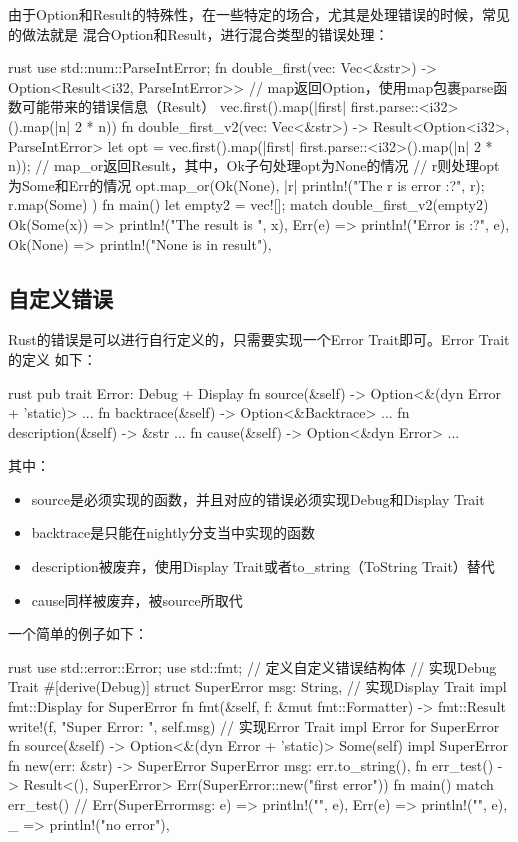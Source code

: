 由于Option和Result的特殊性，在一些特定的场合，尤其是处理错误的时候，常见的做法就是
混合Option和Result，进行混合类型的错误处理：
\begin{code-block}{rust}
use std::num::ParseIntError;
fn double_first(vec: Vec<&str>) -> Option<Result<i32, ParseIntError>> {
    // map返回Option，使用map包裹parse函数可能带来的错误信息（Result）
    vec.first().map(|first| first.parse::<i32>().map(|n| 2 * n))
}
fn double_first_v2(vec: Vec<&str>) -> Result<Option<i32>, ParseIntError> {
    let opt = vec.first().map(|first| first.parse::<i32>().map(|n| 2 * n));
    // map_or返回Result，其中，Ok子句处理opt为None的情况
    // r则处理opt为Some和Err的情况
    opt.map_or(Ok(None), |r| {
        println!("The r is error {:?}", r);
        r.map(Some)
    })
}
fn main() {
    let empty2 = vec![];
    match double_first_v2(empty2) {
        Ok(Some(x)) => println!("The result is {}", x),
        Err(e) => println!("Error is {:?}", e),
        Ok(None) => println!("None is in result"),
    }
}
\end{code-block}

\subsection{自定义错误}
Rust的错误是可以进行自行定义的，只需要实现一个Error Trait即可。Error Trait的定义
如下：
\begin{code-block}{rust}
pub trait Error: Debug + Display {
    fn source(&self) -> Option<&(dyn Error + 'static)> { ... }
    fn backtrace(&self) -> Option<&Backtrace> { ... }
    fn description(&self) -> &str { ... }
    fn cause(&self) -> Option<&dyn Error> { ... }
}
\end{code-block}
其中：
\begin{itemize}
  \item source是必须实现的函数，并且对应的错误必须实现Debug和Display Trait
  \item backtrace是只能在nightly分支当中实现的函数
  \item description被废弃，使用Display Trait或者to\_string（ToString Trait）替代
  \item cause同样被废弃，被source所取代
\end{itemize}

一个简单的例子如下：
\begin{code-block}{rust}
use std::error::Error;
use std::fmt;
// 定义自定义错误结构体
// 实现Debug Trait
#[derive(Debug)]
struct SuperError {
    msg: String,
}
// 实现Display Trait
impl fmt::Display for SuperError {
    fn fmt(&self, f: &mut fmt::Formatter) -> fmt::Result {
        write!(f, "Super Error: {}", self.msg)
    }
}
// 实现Error Trait
impl Error for SuperError {
    fn source(&self) -> Option<&(dyn Error + 'static)> {
        Some(self)
    }
}
impl SuperError {
    fn new(err: &str) -> SuperError {
        SuperError {
            msg: err.to_string(),
        }
    }
}
fn err_test() -> Result<(), SuperError> {
    Err(SuperError::new("first error"))
}
fn main() {
    match err_test() {
        // Err(SuperError{msg: e}) => println!("{}", e),
        Err(e) => println!("{}", e),
        _ => println!("no error"),
    }
}
\end{code-block}

